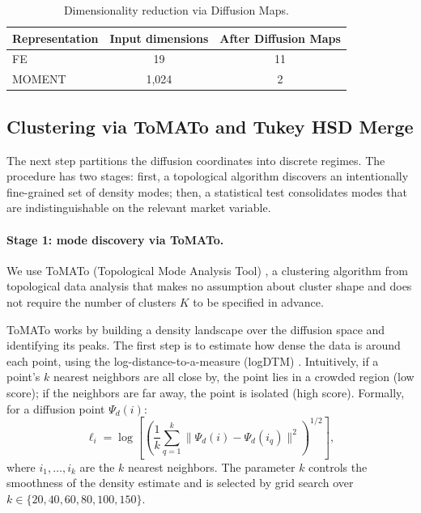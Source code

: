 \documentclass[12pt]{article}
\begin{document}
\begin{table}[H]
\centering
\caption{Dimensionality reduction via Diffusion Maps.}
\label{tab:dimred}
\small
\begin{tabular}{lcc}
\toprule
Representation & Input dimensions & After Diffusion Maps \\
\midrule
FE     & 19    & 11 \\
MOMENT & 1,024 & 2 \\
\bottomrule
\end{tabular}
\end{table}


\subsection{Clustering via ToMATo and Tukey HSD Merge}
\label{sec:clustering}

The next step partitions the diffusion coordinates into discrete regimes.
The procedure has two stages: first, a topological algorithm discovers an intentionally fine-grained set of density modes; then, a statistical test consolidates modes that are indistinguishable on the relevant market variable.

\paragraph{Stage 1: mode discovery via ToMATo.}
We use ToMATo (Topological Mode Analysis Tool) \citep{chazal2013}, a clustering algorithm from topological data analysis that makes no assumption about cluster shape and does not require the number of clusters $K$ to be specified in advance.

ToMATo works by building a density landscape over the diffusion space and identifying its peaks.
The first step is to estimate how dense the data is around each point, using the log-distance-to-a-measure (logDTM) \citep{chazal2011dtm}.
Intuitively, if a point's $k$ nearest neighbors are all close by, the point lies in a crowded region (low score); if the neighbors are far away, the point is isolated (high score).
Formally, for a diffusion point $\Psi_d(i)$:
\begin{equation}
\ell_i
=
\log\!\left[
\left(
\frac{1}{k}
\sum_{q=1}^{k}
\|\Psi_d(i)-\Psi_d(i_q)\|^2
\right)^{1/2}
\right],
\label{eq:logdtm}
\end{equation}
where $i_1,\ldots,i_k$ are the $k$ nearest neighbors.
The parameter $k$ controls the smoothness of the density estimate and is selected by grid search over $k \in \{20, 40, 60, 80, 100, 150\}$.
\end{document}
